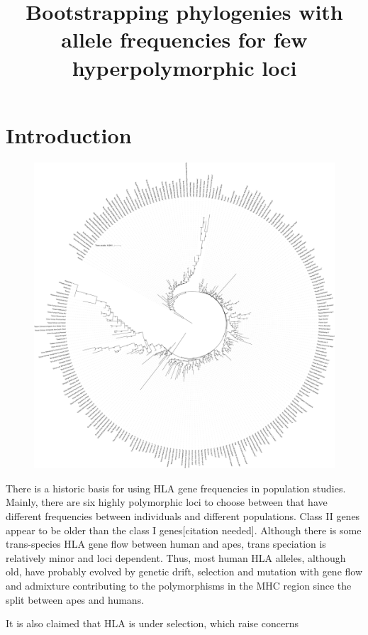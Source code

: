 \documentclass{article}
\title{Bootstrapping phylogenies with allele frequencies for few hyperpolymorphic loci}
\begin{document}
\section{Introduction}

\begin{figure}
    \centering
    \includegraphics[width=\textwidth]{Figures/maj_AB_nj_246_99.pdf}
    \label{treeAB}
\end{figure}

There is a historic basis for using HLA gene frequencies in population studies. Mainly, there are six highly polymorphic
loci to choose between that have different frequencies between individuals and different populations. Class II genes
appear to be older than the class I genes[citation needed]. Although there is some trans-species HLA gene flow between human and apes,
trans speciation is relatively minor and loci dependent. Thus, most human HLA alleles, although old, have probably
evolved by genetic drift, selection and mutation with gene flow and admixture contributing to the polymorphisms in the
MHC region since the split between apes and humans.


It is also claimed that HLA is under selection, which raise concerns %
\end{document}
